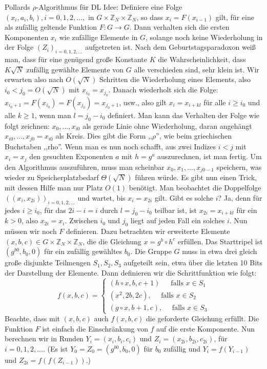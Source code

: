 \documentclass[a4paper]{article}
\begin{document}
\begin{multicols}{3}
{{{{            Pollards $ρ$-Algorithmus für DL
            Idee: Definiere eine Folge $(x_i,a_i,b_i),i= 0,1,2,...,$ in $G\times\mathbb{Z}_N\times\mathbb{Z}_N$, so dass $x_i=F(x_{i-1})$ gilt, für eine als zufällig geltende Funktion $F:G\rightarrow G$. Dann verhalten sich die ersten Komponenten $x_i$ wie zufällige Elemente in $G$, solange noch keine Wiederholung in der Folge $(Z_i)_{i=0, 1 , 2 ,...}$ aufgetreten ist. Nach dem Geburtstagsparadoxon weiß man, dass für eine genügend große Konstante $K$ die Wahrscheinlichkeit, dass $K\sqrt{N}$ zufällig gewählte Elemente von $G$ alle verschieden sind, sehr klein ist. Wir erwarten also nach $O(\sqrt{N})$ Schritten die Wiederholung eines Elements, also $i_0< j_0=O(\sqrt{N})$ mit $x_{i_0}= x_{j_0}$. Danach wiederholt sich die Folge: $x_{i_0 +1}= F(x_{i_0}) =F(x_{j_0}) = x_{j_0 +1}$, usw., also gilt $x_i=x_{i+kl}$ für alle $i\geq i_0$ und alle $k\geq 1$, wenn man $l=j_0 -i_0$ definiert. Man kann das Verhalten der Folge wie folgt zeichnen: $x_0,...,x_{i0}$ als gerade Linie ohne Wiederholung, daran angehängt $x_{i0},...,x_{j0}=x_{i0}$ als Kreis. Dies gibt die Form ,,$ρ$'', wie beim griechischen Buchstaben ,,rho''. Wenn man es nun noch schafft, aus zwei Indizes $i < j$ mit $x_i=x_j$ den gesuchten Exponenten $a$ mit $h=g^a$ auszurechnen, ist man fertig.
            Um den Algorithmus auszuführen, muss man scheinbar $x_0,x_1,...,x_{j0-1}$ speichern, was wieder zu Speicherplatzbedarf $Θ(\sqrt{N})$ führen würde. Es gibt nun einen Trick, mit dessen Hilfe man nur Platz $O(1)$ benötigt. Man beobachtet die Doppelfolge $((x_i,x_{2i}))_{i=0, 1 , 2 ,...}$ und wartet, bis $x_i= x_{2i}$ gilt. Gibt es solche $i$? Ja, denn für jedes $i\geq i_0$, für das $2i-i=i$ durch $l=j_0-i_0$ teilbar ist, ist $x_{2i}=x_{i+kl}$ für ein $k>0$, also $x_{2i}=x_i$. Zwischen $i_0$ und $j_0$ liegt auf jeden Fall ein solches $i$. Nun müssen wir noch $F$ definieren. Dazu betrachten wir erweiterte Elemente $(x,b,c)\in G\times\mathbb{Z}_N \times\mathbb{Z}_N$, die die Gleichung $x=g^b \circ h^c$ erfüllen. Das Starttripel ist $(g^{b0},b_0,0)$ für ein zufällig gewähltes $b_0$. Die Gruppe $G$ muss in etwa drei gleich große disjunkte Teilmengen $S_1,S_2,S_3$ aufgeteilt sein, etwa über die letzten 10 Bits der Darstellung der Elemente. Dann definieren wir die Schrittfunktion wie folgt:
            $$f(x,b,c) =\begin{cases} (h\circ x,b,c+1)\,\quad\text{ falls }x\in S_1\\ (x^2, 2b, 2c),\quad\text{ falls }x\in S_2\\ (g\circ x,b+1,c),\quad\text{ falls } x\in S_3 \end{cases}$$
            Beachte, dass mit $(x,b,c)$ auch $f(x,b,c)$ die geforderte Gleichung erfüllt. Die Funktion $F$ ist einfach die Einschränkung von $f$ auf die erste Komponente.
            Nun berechnen wir in Runden $Y_i= (x_i,b_i,c_i)$ und $Z_i= (x_{2i},b_{2i},c_{2i})$, für $i=0,1,2,....$ (Es ist $Y_0=Z_0=(g^{b0},b_0,0)$ für $b_0$ zufällig und $Y_i=f(Y_{i-1})$ und $Z_{2i}=f(f(Z_{i-1}))$.)

}}}}
\end{multicols}
\end{document}

